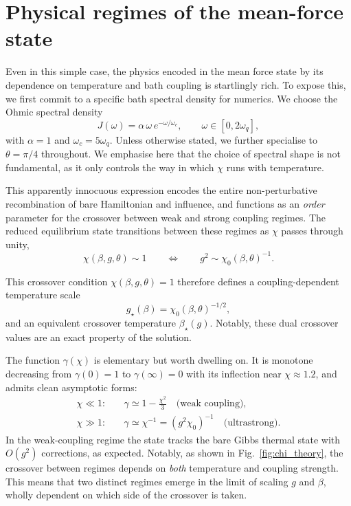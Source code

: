 \section{Physical regimes of the mean-force state}
\label{sec:physical_regimes}
Even in this simple case, the physics encoded in the mean force state by its dependence on temperature and bath coupling is startlingly rich. To expose this, we first commit to a specific bath spectral density for numerics.  We choose
the Ohmic spectral density
\begin{equation}
  J(\omega) = \alpha\,\omega\,e^{-\omega/\omega_c},
  \qquad \omega\in[0,2\omega_q],
  \label{eq:J_ohmic}
\end{equation}
with $\alpha=1$ and $\omega_c = 5\omega_q$. Unless otherwise stated, we further specialise to $\theta=\pi/4$
throughout.  We emphasise here that the choice of spectral shape is not fundamental,
as it only controls the way in which $\chi$ runs
with temperature. 

This apparently innocuous expression encodes the entire non-perturbative recombination of bare Hamiltonian and influence, and functions as an \emph{order} parameter for the crossover between weak and strong coupling regimes. The reduced equilibrium state transitions between these regimes as $\chi$ passes through unity,
\begin{equation}
    \chi(\beta,g,\theta)\sim 1
    \qquad \Longleftrightarrow \qquad
    g^2 \sim \chi_0(\beta,\theta)^{-1}.
    \label{eq:chi_crossover_condition_v5}
\end{equation}



This crossover condition $\chi(\beta,g,\theta)=1$ therefore
defines a coupling-dependent temperature scale
\begin{equation}
  g_\star(\beta) = \chi_0(\beta,\theta)^{-1/2},
  \label{eq:gstar_def_v6}
\end{equation}
and an equivalent crossover temperature $\beta_\star(g)$. Notably, these dual crossover values are an exact property of the solution.

The function $\gamma(\chi)$ is elementary but worth dwelling on. It is monotone decreasing
from $\gamma(0)=1$ to $\gamma(\infty)=0$ with its inflection near $\chi\approx
1.2$, and admits clean asymptotic forms:
\begin{align}
  \chi \ll 1:\quad &\gamma \simeq 1 - \tfrac{\chi^2}{3}
    \quad\text{(weak coupling)},  \label{eq:gamma_weak}\\
  \chi \gg 1:\quad &\gamma \simeq \chi^{-1} = (g^2\chi_0)^{-1}
    \quad\text{(ultrastrong)}.   \label{eq:gamma_strong}
\end{align}
In the weak-coupling regime the state tracks the bare Gibbs thermal state with
$O(g^2)$ corrections, as expected. Notably, as shown in Fig.~\ref{fig:chi_theory}, the crossover between regimes depends on \emph{both} temperature and coupling strength. This means that two distinct regimes emerge in the limit of scaling $g$ and $\beta$, wholly dependent on which side of the crossover is taken. 

